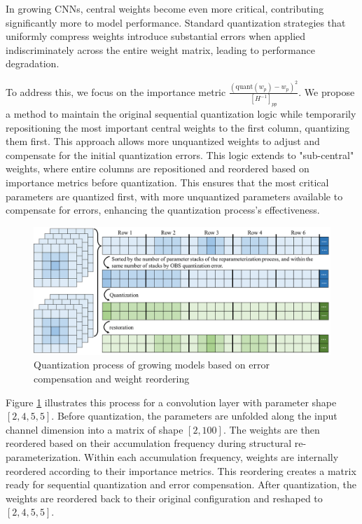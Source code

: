 \documentclass[preprint,12pt]{elsarticle}
\begin{document}
In growing CNNs, central weights become even more critical, contributing significantly more to model performance. Standard quantization strategies that uniformly compress weights introduce substantial errors when applied indiscriminately across the entire weight matrix, leading to performance degradation.

To address this, we focus on the importance metric \(\frac{\left(\mathrm{quant}\left(w_p\right)-w_p\right)^2}{\left[H^{-1}\right]_{pp}}\). We propose a method to maintain the original sequential quantization logic while temporarily repositioning the most important central weights to the first column, quantizing them first. This approach allows more unquantized weights to adjust and compensate for the initial quantization errors. This logic extends to "sub-central" weights, where entire columns are repositioned and reordered based on importance metrics before quantization. This ensures that the most critical parameters are quantized first, with more unquantized parameters available to compensate for errors, enhancing the quantization process's effectiveness.

\begin{figure}[ht]
\centering
\includegraphics[width=\textwidth]{imgs/quant.png}
\caption{Quantization process of growing models based on error compensation and weight reordering}
\label{fig:quantization}
\end{figure}

Figure \ref{fig:quantization} illustrates this process for a convolution layer with parameter shape \([2, 4, 5, 5]\). Before quantization, the parameters are unfolded along the input channel dimension into a matrix of shape \([2, 100]\). The weights are then reordered based on their accumulation frequency during structural re-parameterization. Within each accumulation frequency, weights are internally reordered according to their importance metrics. This reordering creates a matrix ready for sequential quantization and error compensation. After quantization, the weights are reordered back to their original configuration and reshaped to \([2, 4, 5, 5]\).
\end{document}
